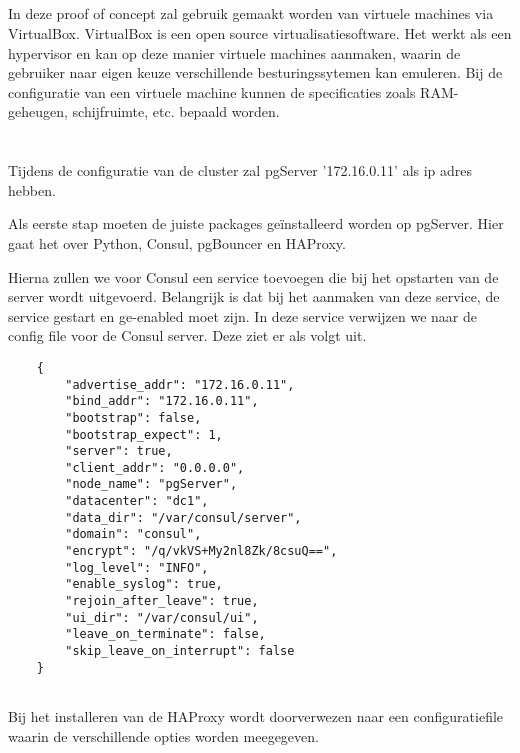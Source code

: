 \subsection{}
\label{subsec:VirtualBox}
In deze proof of concept zal gebruik gemaakt worden van virtuele machines via VirtualBox. VirtualBox is een open source virtualisatiesoftware. Het werkt als een hypervisor en kan op deze manier virtuele machines aanmaken, waarin de gebruiker naar eigen keuze verschillende besturingssytemen kan emuleren. Bij de configuratie van een virtuele machine kunnen de specificaties zoals RAM-geheugen, schijfruimte, etc. bepaald worden.



\section{}
\label{sec:pgServer}
Tijdens de configuratie van de cluster zal pgServer '172.16.0.11' als ip adres hebben.

Als eerste stap moeten de juiste packages geïnstalleerd worden op pgServer. Hier gaat het over Python, Consul, pgBouncer en HAProxy.

Hierna zullen we voor Consul een service toevoegen die bij het opstarten van de server wordt uitgevoerd. Belangrijk is dat bij het aanmaken van deze service, de service gestart en ge-enabled moet zijn. In deze service verwijzen we naar de config file voor de Consul server. Deze ziet er als volgt uit.

\begin{lstlisting}
    {
        "advertise_addr": "172.16.0.11",
        "bind_addr": "172.16.0.11",
        "bootstrap": false,
        "bootstrap_expect": 1,
        "server": true,
        "client_addr": "0.0.0.0",
        "node_name": "pgServer",
        "datacenter": "dc1",
        "data_dir": "/var/consul/server",
        "domain": "consul",
        "encrypt": "/q/vkVS+My2nl8Zk/8csuQ==",
        "log_level": "INFO",
        "enable_syslog": true,
        "rejoin_after_leave": true,
        "ui_dir": "/var/consul/ui",
        "leave_on_terminate": false,
        "skip_leave_on_interrupt": false
    }
    
 \end{lstlisting}

Bij het installeren van de HAProxy wordt doorverwezen naar een configuratiefile waarin de verschillende opties worden meegegeven.

